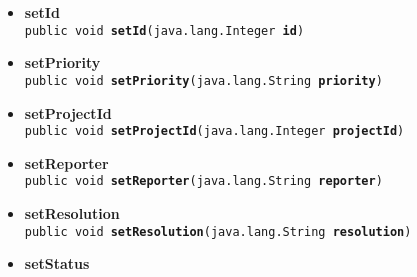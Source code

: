 {{{\begin{itemize}
{\hypertarget{it.unisa.sesa.repominer.db.entities.Issue.setFixVersion(java.lang.String)}{{\bf  setFixVersion}\\}
\texttt{public void\ {\bf  setFixVersion}(\texttt{java.lang.String} {\bf  fixVersion})
\label{it.unisa.sesa.repominer.db.entities.Issue.setFixVersion(java.lang.String)}}%
}%
\item{ 
\hypertarget{it.unisa.sesa.repominer.db.entities.Issue.setId(java.lang.Integer)}{{\bf  setId}\\}
\texttt{public void\ {\bf  setId}(\texttt{java.lang.Integer} {\bf  id})
\label{it.unisa.sesa.repominer.db.entities.Issue.setId(java.lang.Integer)}}%
}%
\item{ 
\hypertarget{it.unisa.sesa.repominer.db.entities.Issue.setPriority(java.lang.String)}{{\bf  setPriority}\\}
\texttt{public void\ {\bf  setPriority}(\texttt{java.lang.String} {\bf  priority})
\label{it.unisa.sesa.repominer.db.entities.Issue.setPriority(java.lang.String)}}%
}%
\item{ 
\hypertarget{it.unisa.sesa.repominer.db.entities.Issue.setProjectId(java.lang.Integer)}{{\bf  setProjectId}\\}
\texttt{public void\ {\bf  setProjectId}(\texttt{java.lang.Integer} {\bf  projectId})
\label{it.unisa.sesa.repominer.db.entities.Issue.setProjectId(java.lang.Integer)}}%
}%
\item{ 
\hypertarget{it.unisa.sesa.repominer.db.entities.Issue.setReporter(java.lang.String)}{{\bf  setReporter}\\}
\texttt{public void\ {\bf  setReporter}(\texttt{java.lang.String} {\bf  reporter})
\label{it.unisa.sesa.repominer.db.entities.Issue.setReporter(java.lang.String)}}%
}%
\item{ 
\hypertarget{it.unisa.sesa.repominer.db.entities.Issue.setResolution(java.lang.String)}{{\bf  setResolution}\\}
\texttt{public void\ {\bf  setResolution}(\texttt{java.lang.String} {\bf  resolution})
\label{it.unisa.sesa.repominer.db.entities.Issue.setResolution(java.lang.String)}}%
}%
\item{ 
\hypertarget{it.unisa.sesa.repominer.db.entities.Issue.setStatus(java.lang.String)}{{\bf  setStatus}\\}
}
\end{itemize}}}}

